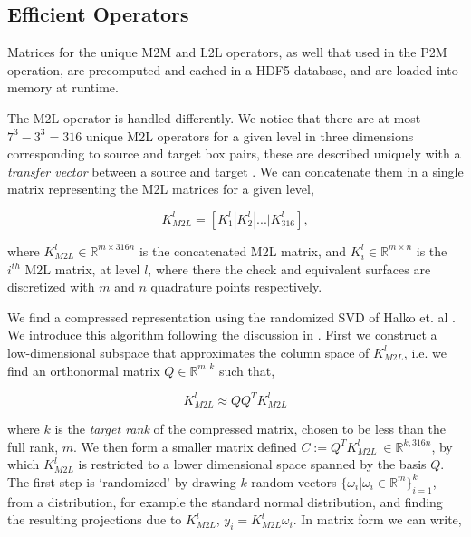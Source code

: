 \documentclass{IEEEcsmag}
\begin{document}
\subsection{Efficient Operators}

Matrices for the unique M2M and L2L operators, as well that used in the P2M operation, are precomputed and cached in a HDF5 database, and are loaded into memory at runtime.

The M2L operator is handled differently. We notice that there are at most $7^3-3^3=316$ unique M2L operators for a given level in three dimensions corresponding to source and target box pairs, these are described uniquely with a \textit{transfer vector} between a source and target \cite{Fong2009}. We can concatenate them in a single matrix representing the M2L matrices for a given level,

\begin{equation}
    K_{M2L}^{l} = \left [ K^l_1 | K^l_2 | ... | K^l_{316} \right],
    \label{eq:2_4_concatenated_m2l}
\end{equation}

where $K_{M2L}^l \in \mathbb{R}^{m \times 316n}$ is the concatenated M2L matrix, and $K_i^l \in \mathbb{R}^{m \times n}$ is the $i^{th}$ M2L matrix, at level $l$, where there the check and equivalent surfaces are discretized with $m$ and $n$ quadrature points respectively.

We find a compressed representation using the randomized SVD of Halko et. al \cite{Halko2011}. We introduce this algorithm following the discussion in \cite{Erichson}. First we construct a low-dimensional subspace that approximates the column space of $K_{M2L}^l$, i.e. we
find an orthonormal matrix $Q \in \mathbb{R}^{m, k}$ such that,

\begin{equation}
    K_{M2L}^l \approx QQ^TK_{M2L}^l
    \label{eq:2_4_step_1_randomised}
\end{equation}

where $k$ is the \textit{target rank} of the compressed matrix, chosen to be less than the full rank, $m$. We then form a smaller matrix defined $C := Q^TK_{M2L}^l \> \in \mathbb{R}^{k, 316n}$, by which $K_{M2L}^l$ is restricted to a lower dimensional space spanned by the basis $Q$. The first step is `randomized' by drawing $k$ random vectors $\{ \omega_i | \omega_i \in \mathbb{R}^m \}_{i=1}^k$, from a distribution, for example the standard normal distribution, and finding the resulting projections due to $K_{M2L}^l$, $y_i = K_{M2L}^l \omega_i$. In matrix form we can write,
\end{document}
